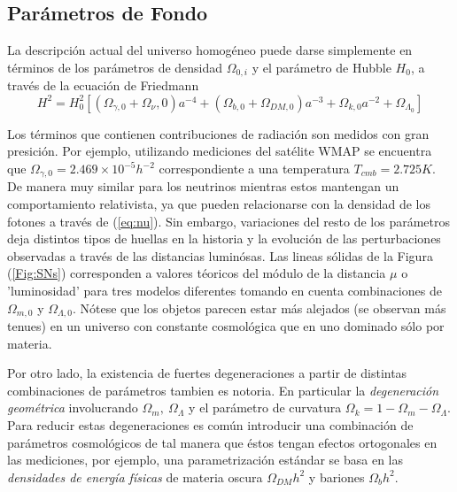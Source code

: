 \documentclass[10.5pt,prb,
               showpacs,            %
               preprintnumbers,     %
               aps,                 %
               prl,          	    %
               letterpaper,             %
               superscriptaddress,      %
               nofootinbib,         %
               tightenlines,        %
               floats,floatfix      %
               ,usenatbib]{revtex4-1}%
\def\beq{\begin{equation}}
\def\eeq{\end{equation}}
\begin{document}
\subsection*{Par\'ametros de Fondo}


La descripci\'on actual del universo homog\'eneo puede darse simplemente en t\'erminos de los par\'ametros de 
densidad $\Omega_{0,i}$ y el par\'ametro de Hubble $H_{0}$, a trav\'es de la ecuaci\'on de Friedmann
%
	\beq
		H^2 = H_0^2 \left[(\Omega_{\gamma,0} + \Omega_\nu, 0)a^{-4} + (\Omega_{b, 0} + \Omega_{DM, 0})a^{-3} 
					+ \Omega_{k,0}a^{-2} + \Omega_{\Lambda_0}\right]
	\eeq


Los t\'erminos que contienen contribuciones de radiaci\'on son medidos con gran presici\'on. Por ejemplo, utilizando  
mediciones del sat\'elite WMAP se encuentra que $\Omega_{\gamma,0} = 2.469 \times 10^{-5} h^{-2}$  correspondiente 
a una temperatura $T_{cmb}=2.725K$. 
De manera muy similar para los neutrinos mientras estos mantengan un comportamiento relativista, ya que pueden 
relacionarse con la densidad de los fotones a trav\'es de (\ref{eq:nu}). 
Sin embargo, variaciones del resto de los par\'ametros deja distintos tipos de huellas en la historia y la evoluci\'on
de las perturbaciones observadas a trav\'es de las distancias lumin\'osas.
Las lineas s\'olidas de la Figura (\ref{Fig:SNs}) corresponden a valores t\'eoricos 
del m\'odulo de la distancia $\mu$ o 'luminosidad' para tres modelos diferentes tomando en cuenta
combinaciones de $\Omega_{m,0}$ y $\Omega_{\Lambda,0}$. N\'otese que los objetos parecen estar m\'as alejados 
(se observan m\'as tenues) en un universo con constante cosmol\'ogica que en uno dominado s\'olo por materia.


Por otro lado, la existencia de fuertes degeneraciones a partir de distintas combinaciones de par\'ametros tambien es notoria.
En particular la \textit{degeneraci\'on geom\'etrica} involucrando $\Omega_m,~\Omega_\Lambda$
y el par\'ametro de curvatura $\Omega_k=1 - \Omega_m - \Omega_\Lambda$. Para reducir estas degeneraciones
es com\'un introducir una combinaci\'on de par\'ametros cosmol\'ogicos de tal manera que \'estos tengan efectos ortogonales
en las mediciones, por ejemplo, una parametrizaci\'on est\'andar se basa en las \textit{densidades de energ\'ia f\'isicas}
de  materia oscura $\Omega_{DM}h^2$ y bariones $\Omega_b h^2$.
\end{document}
